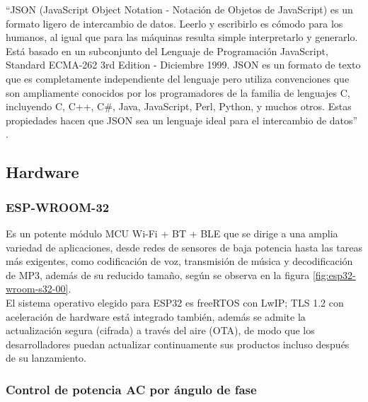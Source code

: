``JSON (JavaScript Object Notation - Notación de Objetos de JavaScript) es un formato ligero de intercambio de datos. Leerlo y escribirlo es cómodo para los humanos, al igual que para las máquinas resulta simple interpretarlo y generarlo. Está basado en un subconjunto del Lenguaje de Programación JavaScript, Standard ECMA-262 3rd Edition - Diciembre 1999. JSON es un formato de texto que es completamente independiente del lenguaje pero utiliza convenciones que son ampliamente conocidos por los programadores de la familia de lenguajes C, incluyendo C, C++, C\#, Java, JavaScript, Perl, Python, y muchos otros. Estas propiedades hacen que JSON sea un lenguaje ideal para el intercambio de datos'' \cite{JSON}.\\

\subsection{Hardware}

\subsubsection{ESP-WROOM-32}

Es un potente módulo MCU Wi-Fi + BT + BLE que se dirige a una amplia variedad de aplicaciones, desde redes de sensores de baja potencia hasta las tareas más exigentes, como codificación de voz, transmisión de música y decodificación de MP3, además de su reducido tamaño, según se observa en la figura \ref{fig:esp32-wroom-s32-00}.\\

El sistema operativo elegido para ESP32 es freeRTOS con LwIP; TLS 1.2 con aceleración de hardware está integrado también, además se admite la actualización segura (cifrada) a través del aire (OTA), de modo que los desarrolladores puedan actualizar continuamente sus productos incluso después de su lanzamiento.\cite{EW32}\\


\subsubsection{Control de potencia AC por ángulo de fase}

